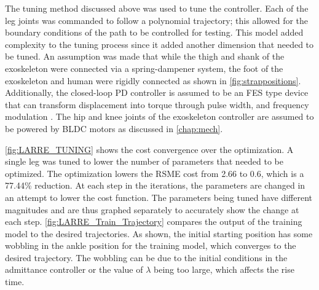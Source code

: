 The tuning method discussed above was used to tune the controller. Each of the leg joints was commanded to follow a polynomial trajectory; this allowed for the boundary conditions of the path to be controlled for testing. This model added complexity to the tuning process since it added another dimension that needed to be tuned. An assumption was made that while the thigh and shank of the exoskeleton were connected via a spring-dampener system, the foot of the exoskeleton and human were rigidly connected as shown in \autoref{fig:strappositions}. Additionally, the closed-loop PD controller is assumed to be an FES type device that can transform displacement into torque through pulse width, and frequency modulation \cite{rouhani2017pid, ha2015approach,Model_Ferrarin}. The hip and knee joints of the exoskeleton controller are assumed to be powered by BLDC motors as discussed in \autoref{chap:mech}.

\autoref{fig:LARRE_TUNING} shows the cost convergence over the optimization. A single leg was tuned to lower the number of parameters that needed to be optimized. The optimization lowers the RSME cost from 2.66 to 0.6, which is a 77.44\% reduction. At each step in the iterations, the parameters are changed in an attempt to lower the cost function. The parameters being tuned have different magnitudes and are thus graphed separately to accurately show the change at each step. \autoref{fig:LARRE_Train_Trajectory} compares the output of the training model to the desired trajectories.  As shown, the initial starting position has some wobbling in the ankle position for the training model, which converges to the desired trajectory. The wobbling can be due to the initial conditions in the admittance controller or the value of $\lambda$ being too large, which affects the rise time.  

